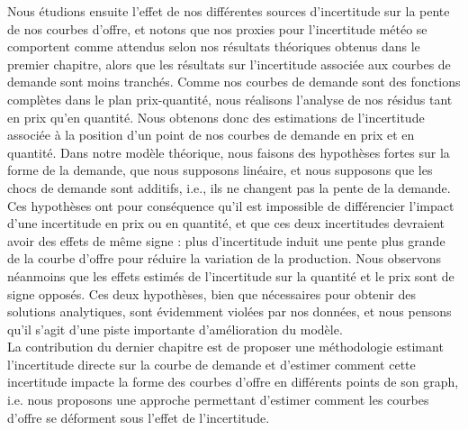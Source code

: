 Nous étudions ensuite l'effet de nos différentes sources d'incertitude sur la pente de nos courbes d'offre, et notons que nos proxies pour l'incertitude météo se comportent comme attendus selon nos résultats théoriques obtenus dans le premier chapitre, alors que les résultats sur l'incertitude associée aux courbes de demande sont moins tranchés. Comme nos courbes de demande sont des fonctions complètes dans le plan prix-quantité, nous réalisons l'analyse de nos résidus tant en prix qu'en quantité. Nous obtenons donc des estimations de l'incertitude associée à la position d'un point de nos courbes de demande en prix et en quantité. Dans notre modèle théorique, nous faisons des hypothèses fortes sur la forme de la demande, que nous supposons linéaire, et nous supposons que les chocs de demande sont additifs, i.e., ils ne changent pas la pente de la demande. Ces hypothèses ont pour conséquence qu'il est impossible de différencier l'impact d'une incertitude en prix ou en quantité, et que ces deux incertitudes devraient avoir des effets de même signe : plus d'incertitude induit une pente plus grande de la courbe d'offre pour réduire la variation de la production. Nous observons néanmoins que les effets estimés de l'incertitude sur la quantité et le prix sont de signe opposés. Ces deux hypothèses, bien que nécessaires pour obtenir des solutions analytiques, sont évidemment violées par nos données, et nous pensons qu'il s'agit d'une piste importante d'amélioration du modèle.\\

La contribution du dernier chapitre est de proposer une méthodologie estimant l'incertitude directe sur la courbe de demande et d'estimer comment cette incertitude impacte la forme des courbes d'offre en différents points de son graph, i.e. nous proposons une approche permettant d'estimer comment les courbes d'offre se déforment sous l'effet de l'incertitude.\\



 